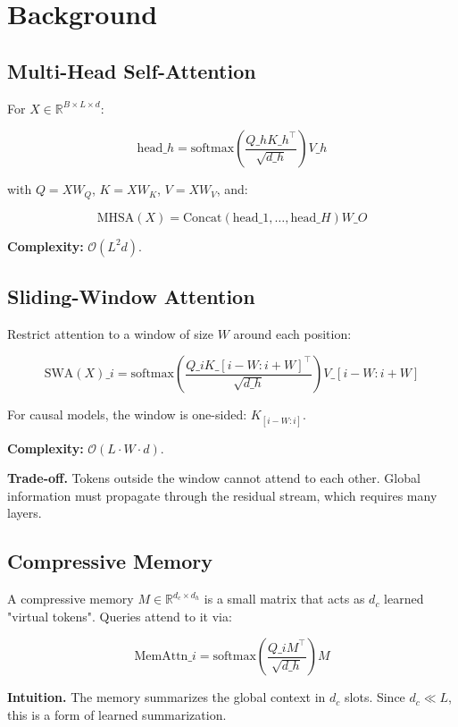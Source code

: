 
\section{Background}

\subsection{Multi-Head Self-Attention}

For $X \in \mathbb{R}^{B \times L \times d}$:

\[
\text{head}\_h = \text{softmax}\!\left(\frac{Q\_h K\_h^\top}{\sqrt{d\_h}}\right) V\_h
\tag{3.1}
\]

with $Q = X W_Q$, $K = X W_K$, $V = X W_V$, and:

\[
\text{MHSA}(X) = \text{Concat}(\text{head}\_1, \dots, \text{head}\_H) W\_O
\tag{3.2}
\]

\textbf{Complexity:} $\mathcal{O}(L^2 d)$.

\subsection{Sliding-Window Attention}

Restrict attention to a window of size $W$ around each position:

\[
\text{SWA}(X)\_i = \text{softmax}\!\left(\frac{Q\_i K\_{[i-W:i+W]}^\top}{\sqrt{d\_h}}\right) V\_{[i-W:i+W]}
\tag{3.3}
\]

For causal models, the window is one-sided: $K_{[i-W:i]}$.

\textbf{Complexity:} $\mathcal{O}(L \cdot W \cdot d)$.

\textbf{Trade-off.} Tokens outside the window cannot attend to each other. 
Global information must propagate through the residual stream, which 
requires many layers.

\subsection{Compressive Memory}

A compressive memory $M \in \mathbb{R}^{d_c \times d_h}$ is a small matrix 
that acts as $d_c$ learned "virtual tokens". Queries attend to it via:

\[
\text{MemAttn}\_i = \text{softmax}\!\left(\frac{Q\_i M^\top}{\sqrt{d\_h}}\right) M
\tag{3.4}
\]

\textbf{Intuition.} The memory summarizes the global context in $d_c$ slots. 
Since $d_c \ll L$, this is a form of learned summarization.

